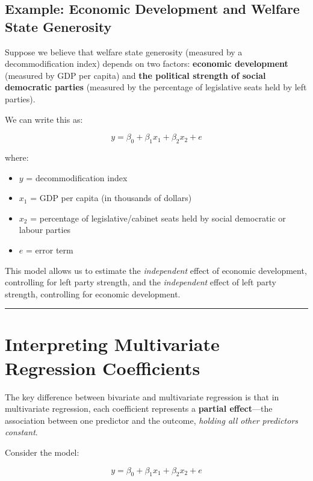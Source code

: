 \documentclass[
  letterpaper,
  DIV=11,
  numbers=noendperiod]{scrreprt}
\providecommand{\tightlist}{%
  \setlength{\itemsep}{0pt}\setlength{\parskip}{0pt}}
\begin{document}
\subsection{Example: Economic Development and Welfare State
Generosity}\label{example-economic-development-and-welfare-state-generosity}

Suppose we believe that welfare state generosity (measured by a
decommodification index) depends on two factors: \textbf{economic
development} (measured by GDP per capita) and \textbf{the political
strength of social democratic parties} (measured by the percentage of
legislative seats held by left parties).

We can write this as:

\[
y = \beta_0 + \beta_1 x_1 + \beta_2 x_2 + e
\]

where:

\begin{itemize}
\tightlist
\item
  \(y\) = decommodification index
\item
  \(x_1\) = GDP per capita (in thousands of dollars)
\item
  \(x_2\) = percentage of legislative/cabinet seats held by social
  democratic or labour parties
\item
  \(e\) = error term
\end{itemize}

This model allows us to estimate the \emph{independent} effect of
economic development, controlling for left party strength, and the
\emph{independent} effect of left party strength, controlling for
economic development.

\begin{center}\rule{0.5\linewidth}{0.5pt}\end{center}

\section{Interpreting Multivariate Regression
Coefficients}\label{interpreting-multivariate-regression-coefficients}

The key difference between bivariate and multivariate regression is that
in multivariate regression, each coefficient represents a
\textbf{partial effect}---the association between one predictor and the
outcome, \emph{holding all other predictors constant}.

Consider the model:

\[
y = \beta_0 + \beta_1 x_1 + \beta_2 x_2 + e
\]
\end{document}
